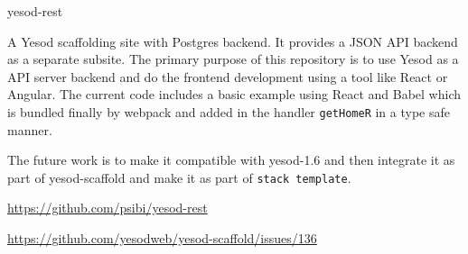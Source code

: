 \begin{hcarentry}{yesod-rest}
\makeheader

A Yesod scaffolding site with Postgres backend. It provides a JSON API backend
as a separate subsite. The primary purpose of this repository is to use Yesod
as a API server backend and do the frontend development using a tool like
React or Angular. The current code includes a basic example using React and
Babel which is bundled finally by webpack and added in the handler
\texttt{getHomeR} in a type safe manner.

The future work is to make it compatible with yesod-1.6 and then integrate
it as part of yesod-scaffold and make it as part of \texttt{stack
  template}.

\FurtherReading
  \begin{compactitem}
    \item \url{https://github.com/psibi/yesod-rest}
    \item \url{https://github.com/yesodweb/yesod-scaffold/issues/136}
  \end{compactitem}
\end{hcarentry}
